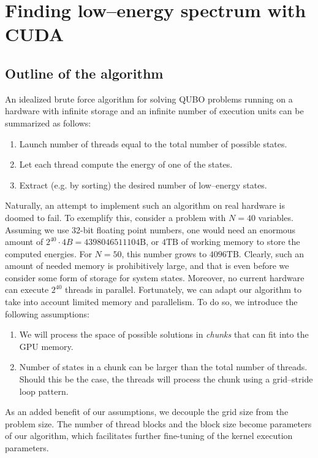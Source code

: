 
\section{Finding low--energy spectrum with CUDA}
\subsection{Outline of the algorithm}
An idealized brute force algorithm for solving QUBO problems running on a
hardware with infinite storage and an infinite number of execution units can be
summarized as follows:
\begin{enumerate}
  \item Launch number of threads equal to the total number of possible states.
  \item Let each thread compute the energy of one of the states.
  \item Extract (e.g. by sorting) the desired number of low--energy states.
\end{enumerate}
Naturally, an attempt to implement such an algorithm on real hardware is doomed
to fail. To exemplify this, consider a problem with $N=40$ variables. Assuming
we use 32-bit floating point numbers, one would need an enormous amount of
$2^{40}\cdot 4B = 4398046511104\mbox{B}$, or $4\mbox{TB}$ of working memory to
    store the computed energies. For $N=50$, this number grows to $4096\mbox{TB}$.
    Clearly, such an amount of needed memory is prohibitively large, and that is
    even before we consider some form of storage for system states. Moreover, no
    current hardware can execute $2^{40}$ threads in parallel. Fortunately, we can
    adapt our algorithm to take into account limited memory and parallelism. To do
    so, we introduce the following assumptions:
    \begin{enumerate}
      \item We will process the space of possible solutions in \emph{chunks} that can fit into the GPU
        memory.
      \item Number of states in a chunk can be larger than the total number of threads.
        Should this be the case, the threads will process the chunk using a
        grid--stride loop pattern.
    \end{enumerate}
    As an added benefit of our assumptions, we decouple the grid size from the
    problem size. The number of thread blocks and the block size become parameters of
    our algorithm, which facilitates further fine-tuning of the kernel execution
    parameters.

